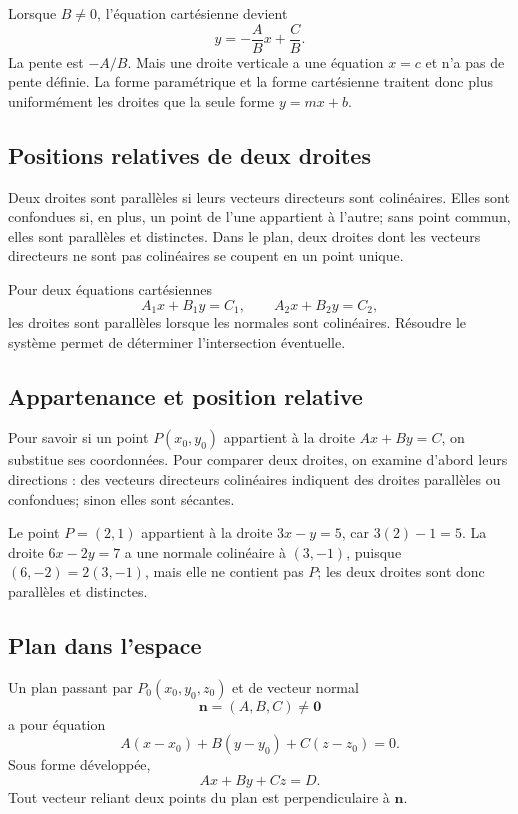 Lorsque $B\neq0$, l'équation cartésienne devient
\[
y=-\frac ABx+\frac CB.
\]
La pente est $-A/B$. Mais une droite verticale a une équation $x=c$ et n'a pas de pente définie. La forme paramétrique et la forme cartésienne traitent donc plus uniformément les droites que la seule forme $y=mx+b$.

\subsection{Positions relatives de deux droites}

Deux droites sont parallèles si leurs vecteurs directeurs sont colinéaires. Elles sont confondues si, en plus, un point de l'une appartient à l'autre; sans point commun, elles sont parallèles et distinctes. Dans le plan, deux droites dont les vecteurs directeurs ne sont pas colinéaires se coupent en un point unique.

Pour deux équations cartésiennes
\[
A_1x+B_1y=C_1,
\qquad
A_2x+B_2y=C_2,
\]
les droites sont parallèles lorsque les normales sont colinéaires. Résoudre le système permet de déterminer l'intersection éventuelle.

\subsection{Appartenance et position relative}

Pour savoir si un point $P(x_0,y_0)$ appartient à la droite $Ax+By=C$, on substitue ses coordonnées. Pour comparer deux droites, on examine d'abord leurs directions : des vecteurs directeurs colinéaires indiquent des droites parallèles ou confondues; sinon elles sont sécantes.

\begin{examplebox}
Le point $P=(2,1)$ appartient à la droite $3x-y=5$, car $3(2)-1=5$. La droite $6x-2y=7$ a une normale colinéaire à $(3,-1)$, puisque $(6,-2)=2(3,-1)$, mais elle ne contient pas $P$; les deux droites sont donc parallèles et distinctes.
\end{examplebox}

\subsection{Plan dans l'espace}

Un plan passant par $P_0(x_0,y_0,z_0)$ et de vecteur normal
\[
\mathbf n=(A,B,C)\neq\mathbf0
\]
a pour équation
\[
A(x-x_0)+B(y-y_0)+C(z-z_0)=0.
\]
Sous forme développée,
\[
Ax+By+Cz=D.
\]
Tout vecteur reliant deux points du plan est perpendiculaire à $\mathbf n$.

